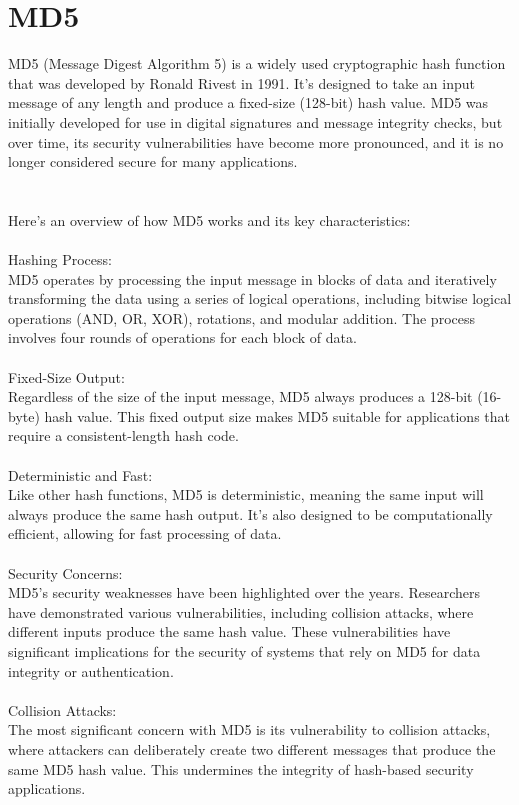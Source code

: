 \documentclass{report}
\begin{document}
\section{MD5}
MD5 (Message Digest Algorithm 5) is a widely used cryptographic hash function that was developed by Ronald Rivest in 1991. It's designed to take an input message of any length and produce a fixed-size (128-bit) hash value. MD5 was initially developed for use in digital signatures and message integrity checks, but over time, its security vulnerabilities have become more pronounced, and it is no longer considered secure for many applications.\\
\\
\\
Here's an overview of how MD5 works and its key characteristics:\\
\\
Hashing Process:\\
 MD5 operates by processing the input message in blocks of data and iteratively transforming the data using a series of logical operations, including bitwise logical operations (AND, OR, XOR), rotations, and modular addition. The process involves four rounds of operations for each block of data.\\
\\
Fixed-Size Output:\\
 Regardless of the size of the input message, MD5 always produces a 128-bit (16-byte) hash value. This fixed output size makes MD5 suitable for applications that require a consistent-length hash code.\\
\\
Deterministic and Fast:\\
 Like other hash functions, MD5 is deterministic, meaning the same input will always produce the same hash output. It's also designed to be computationally efficient, allowing for fast processing of data.\\
\\
Security Concerns:\\
 MD5's security weaknesses have been highlighted over the years. Researchers have demonstrated various vulnerabilities, including collision attacks, where different inputs produce the same hash value. These vulnerabilities have significant implications for the security of systems that rely on MD5 for data integrity or authentication.\\
\\
Collision Attacks:\\
 The most significant concern with MD5 is its vulnerability to collision attacks, where attackers can deliberately create two different messages that produce the same MD5 hash value. This undermines the integrity of hash-based security applications.\\
\end{document}
